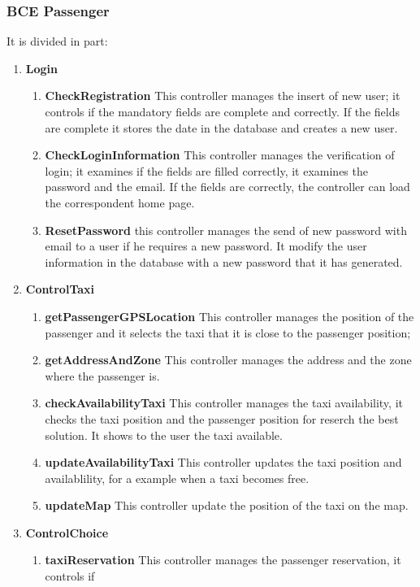 \documentclass[11pt, a4paper,titlepage]{article}
\begin{document}
\subsubsection{BCE Passenger}
It is divided in part:
\begin{enumerate}	
	\item \textbf{Login}
	\begin{enumerate}
		\item \textbf{CheckRegistration} This controller manages the insert of new user; it controls if the mandatory fields are complete and correctly.
		If the fields are complete it stores the date in the database and creates a new user.  
		\item \textbf{CheckLoginInformation} This controller manages the verification of   login; it  
		examines if the fields are filled correctly, it examines the password and the email. 
		If the fields are correctly, the controller can load the correspondent home page.
		\item \textbf{ResetPassword} this controller manages the send of new password with email to a  
		user if he requires a new password.
		It modify the user information in the database with a new password that it has generated.
	\end{enumerate}
	\item \textbf{ControlTaxi}
	\begin{enumerate}
		\item \textbf{getPassengerGPSLocation} This controller manages the position of the passenger  
		and it selects the taxi that it is close to the passenger position;
		\item \textbf{getAddressAndZone} This controller manages the address and the zone where the 
		passenger is.
		\item \textbf{checkAvailabilityTaxi} This controller manages the taxi availability, it checks 
		the taxi position and the passenger position for reserch the best solution.
		It shows to the user the taxi available.
		\item \textbf{updateAvailabilityTaxi} This controller updates the taxi position and 
		availablility, for a example when a taxi becomes free.
		\item \textbf{updateMap} This controller update the position of the taxi on the map.
	\end{enumerate}
	\item \textbf{ControlChoice}
	\begin{enumerate}
		\item \textbf{taxiReservation} This controller manages the passenger reservation, it controls if 

\end{enumerate}
\end{enumerate}
\end{document}
